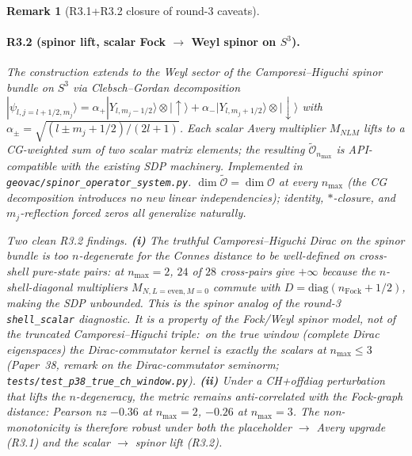 \documentclass[11pt]{article}
\newtheorem{remark}{Remark}
\begin{document}
\begin{remark}[R3.1+R3.2 closure of round-3 caveats]
\paragraph{R3.2 (spinor lift, scalar Fock $\to$ Weyl spinor on
$S^3$).}  The construction extends to the Weyl sector of the
Camporesi--Higuchi spinor bundle on $S^3$ via Clebsch--Gordan
decomposition $|\psi_{l, j = l + 1/2, m_j}\rangle = \alpha_+
|Y_{l, m_j - 1/2}\rangle \otimes |\!\!\uparrow\rangle + \alpha_-
|Y_{l, m_j + 1/2}\rangle \otimes |\!\!\downarrow\rangle$ with
$\alpha_\pm = \sqrt{(l \pm m_j + 1/2)/(2l + 1)}$.  Each scalar
Avery multiplier $M_{NLM}$ lifts to a CG-weighted sum of two
scalar matrix elements; the resulting
$\widetilde{\mathcal{O}}_{n_{\max}}$ is API-compatible with the
existing SDP machinery.  Implemented in
\texttt{geovac/spinor\_operator\_system.py}.  $\dim
\widetilde{\mathcal{O}} = \dim \mathcal{O}$ at every $n_{\max}$
(the CG decomposition introduces no new linear independencies);
identity, $\ast$-closure, and $m_j$-reflection forced zeros all
generalize naturally.

Two clean R3.2 findings.  \textbf{(i)} \emph{The truthful
Camporesi--Higuchi Dirac on the spinor bundle is too
$n$-degenerate} for the Connes distance to be well-defined on
cross-shell pure-state pairs: at $n_{\max} = 2$, $24$ of $28$
cross-pairs give $+\infty$ because the $n$-shell-diagonal
multipliers $M_{N, L = \mathrm{even}, M = 0}$ commute with $D =
\mathrm{diag}(n_{\mathrm{Fock}} + 1/2)$, making the SDP
unbounded.  This is the spinor analog of the round-3
\texttt{shell\_scalar} diagnostic.  It is a property of the Fock/Weyl
spinor \emph{model}, not of the truncated Camporesi--Higuchi triple:\ on
the true window (complete Dirac eigenspaces) the Dirac-commutator
kernel is exactly the scalars at $n_{\max} \le 3$ (Paper~38,
remark on the Dirac-commutator seminorm; \texttt{tests/test\_p38\_true\_ch\_window.py}).
\textbf{(ii)} \emph{Under a CH+offdiag perturbation that lifts
the $n$-degeneracy, the metric remains anti-correlated} with the
Fock-graph distance: Pearson nz $-0.36$ at $n_{\max} = 2$,
$-0.26$ at $n_{\max} = 3$.  The non-monotonicity is therefore
robust under both the placeholder $\to$ Avery upgrade (R3.1)
\emph{and} the scalar $\to$ spinor lift (R3.2).  


\end{remark}
\end{document}
